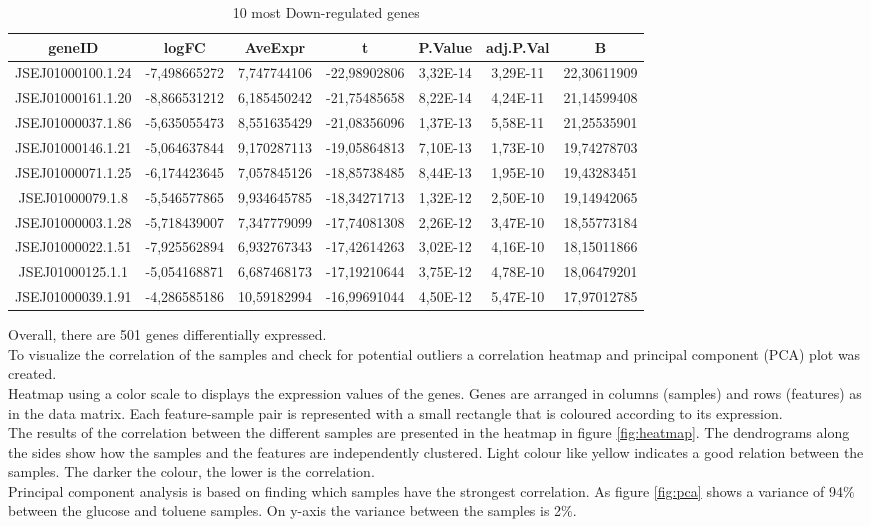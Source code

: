\documentclass[12pt, a4paper]{report}
\begin{document}
\begin{table}[H]
	\centering
	\scriptsize
	\begin{tabular}{c|c|c|c|c|c|c}
		\textbf{geneID}& \textbf{logFC}&\textbf{AveExpr}&\textbf{t}&\textbf{P.Value}&\textbf{adj.P.Val}& \textbf{B}\\
		\hline
		JSEJ01000100.1.24&	-7,498665272&	7,747744106&	-22,98902806&	3,32E-14&	3,29E-11&	22,30611909\\
		JSEJ01000161.1.20&	-8,866531212&	6,185450242	&-21,75485658	&8,22E-14&	4,24E-11&	21,14599408\\
		JSEJ01000037.1.86&	-5,635055473&	8,551635429	&-21,08356096&	1,37E-13&	5,58E-11&	21,25535901\\
		JSEJ01000146.1.21	&-5,064637844&	9,170287113	&-19,05864813&	7,10E-13&	1,73E-10&	19,74278703\\
		JSEJ01000071.1.25	&-6,174423645&	7,057845126	&-18,85738485&	8,44E-13&	1,95E-10&	19,43283451\\
		JSEJ01000079.1.8	&-5,546577865&	9,934645785	&-18,34271713&	1,32E-12&	2,50E-10&	19,14942065\\
		JSEJ01000003.1.28&	-5,718439007&	7,347779099	&-17,74081308&	2,26E-12&	3,47E-10&	18,55773184\\
		JSEJ01000022.1.51&	-7,925562894&	6,932767343	&-17,42614263&	3,02E-12&	4,16E-10&	18,15011866\\
		JSEJ01000125.1.1&	-5,054168871&	6,687468173	&-17,19210644&	3,75E-12&	4,78E-10&	18,06479201\\
		JSEJ01000039.1.91&	-4,286585186&	10,59182994	&-16,99691044&	4,50E-12&	5,47E-10&	17,97012785\\
		\hline
	\end{tabular}
	\caption{10 most Down-regulated genes}
\end{table}

Overall, there are 501 genes differentially expressed. \\
To visualize the correlation of the samples and check for potential outliers a correlation heatmap and principal component (PCA) plot was created. \\
Heatmap using a color scale to displays the expression values of the genes. Genes are arranged in columns (samples) and rows (features) as in the data matrix. Each feature-sample pair is represented with a small rectangle that is coloured according to its expression. \\
The results of the correlation between the different samples are presented in the heatmap in figure \ref{fig:heatmap}. The dendrograms along the sides show how the samples and the features are independently clustered. Light colour like yellow indicates a good relation between the samples. The darker the colour, the lower is the correlation. \\
Principal component analysis is based on finding which samples have the strongest correlation. As figure \ref{fig:pca} shows a variance of 94$\%$ between the glucose and toluene samples. On y-axis the variance between the samples is 2$\%$. 
\ \\
\end{document}
